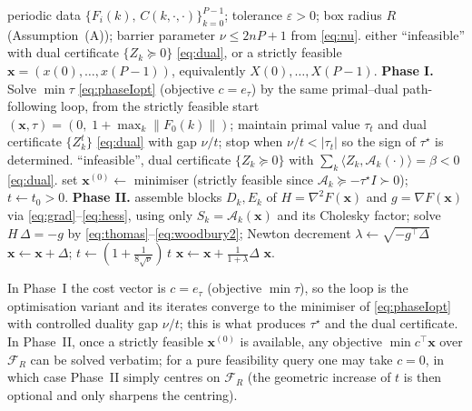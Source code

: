 \documentclass{amsart}
\newcommand{\norm}[1]{\left\lVert#1\right\rVert}
\begin{document}
\begin{algorithm}[t]
\caption{Periodic-structure interior-point solver for PLMI}
\label{alg:main}
\begin{algorithmic}[1]
\Require periodic data $\{F_i(k),\,C(k,\cdot,\cdot)\}_{k=0}^{P-1}$; tolerance
         $\varepsilon>0$; box radius $R$ (Assumption~(A)); barrier parameter
         $\nu\le 2nP+1$ from \eqref{eq:nu}.
\Ensure either ``infeasible'' with dual certificate $\{Z_k\succeq0\}$ \eqref{eq:dual},
         or a strictly feasible $\bm x=(x(0),\dots,x(P-1))$, equivalently $X(0),\dots,X(P-1)$.
\State \textbf{Phase I.} Solve $\min\tau$ \eqref{eq:phaseIopt} (objective $c=e_\tau$)
       by the same primal--dual path-following loop, from the strictly feasible start
       $(\bm x,\tau)=(0,\;1+\max_k\norm{F_0(k)})$; maintain primal value $\tau_t$ and
       dual certificate $\{Z_k^t\}$ \eqref{eq:dual} with gap $\nu/t$; stop when
       $\nu/t<|\tau_t|$ so the sign of $\tau^\star$ is determined.
 \State \Return ``infeasible'', dual certificate $\{Z_k\succeq0\}$
       with $\sum_k\langle Z_k,\mathcal A_k(\cdot)\rangle=\beta<0$ \eqref{eq:dual}.
\Else \State set $\bm x^{(0)}\gets$ minimiser (strictly feasible since
       $\mathcal A_k\succeq-\tau^\star I\succ0$); $t\gets t_0>0$.
\EndIf
\State \textbf{Phase II.}
  \State assemble blocks $D_k,E_k$ of $H=\nabla^2F(\bm x)$ and $g=\nabla F(\bm x)$
         via \eqref{eq:grad}--\eqref{eq:hess}, using only $S_k=\mathcal A_k(\bm x)$ and
         its Cholesky factor; 
  \State solve $H\,\Delta=-g$ by \eqref{eq:thomas}--\eqref{eq:woodbury2};
  \State Newton decrement $\lambda\gets\sqrt{-g^{\!\top}\Delta}$
   \State $\bm x\gets\bm x+\Delta$; $t\gets(1+\tfrac{1}{8\sqrt{\nu}})\,t$
  \Else \State $\bm x\gets\bm x+\tfrac{1}{1+\lambda}\Delta$ 
  \EndIf
\EndWhile
\State \Return $\bm x$.
\end{algorithmic}
\end{algorithm}

In Phase~I the cost vector is $c=e_\tau$ (objective $\min\tau$), so the loop is the
optimisation variant and its iterates converge to the minimiser of \eqref{eq:phaseIopt}
with controlled duality gap $\nu/t$; this is what produces $\tau^\star$ and the dual
certificate. In Phase~II, once a strictly feasible $\bm x^{(0)}$ is available, any
objective $\min c^{\!\top}\bm x$ over $\mathcal F_R$ can be solved verbatim; for a pure
feasibility query one may take $c=0$, in which case Phase~II simply centres on
$\mathcal F_R$ (the geometric increase of $t$ is then optional and only sharpens the
centring).
\end{document}
